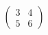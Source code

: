 \documentclass[preview]{standalone}
\begin{document}
\begin{align*}
\begin{pmatrix}3 & 4 \\ 5 & 6\end{pmatrix}
\end{align*}
\end{document}
